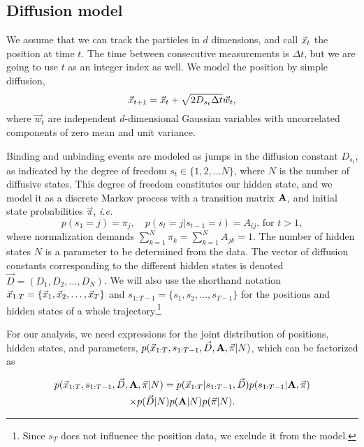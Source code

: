 \subsection{Diffusion model}
\label{Sec:esimodel}
We assume that we can track the particles in $d$ dimensions, and call
$\vec{x}_t$ the position at time $t$.  The time between consecutive
measurements is $\Delta t$, but we are going to use $t$ as an integer
index as well. We model the position by
simple diffusion,
\begin{equation}\label{eq:diff1}
        \vec{x}_{t+1}=\vec{x}_t+\sqrt{2D_{s_t}\Delta t}\vec{w}_t,
\end{equation}
where $\vec{w}_t$ are independent $d$-dimensional Gaussian variables
with uncorrelated components of zero mean and unit variance.

Binding and unbinding events are modeled as jumps in the diffusion
constant $D_{s_t}$, as indicated by the degree of freedom
\mbox{$s_t\in\{1,2,\ldots N\}$}, where $N$ is the number of diffusive 
states. This degree of freedom constitutes our hidden state, and we
model it as a discrete Markov process with a transition matrix
$\mathbf{A}$, and initial state probabilities
$\vec{\pi}$, \textit{i.e.}
\begin{equation}\label{eq:Aij}
p(s_1=j)=\pi_j,\quad 
p(s_t=j|s_{t-1}=i)=A_{ij}\text{, for $t>1$},
\end{equation}
where normalization demands
$\sum_{k=1}^N\pi_k=\sum_{k=1}^NA_{jk}=1$. The number of hidden states
$N$ is a parameter to be determined from the data.  The vector of
diffusion constants corresponding to the different hidden states is
denoted $\vec D=(D_1,D_2,\ldots,D_N)$. We will also use the
shorthand notation $\vec{x}_{1:T}=\{\vec{x}_1,\vec{x}_2,\ldots , \vec{x}_T\}$ and
$s_{1:T-1}=\{s_1,s_2,\ldots,s_{T-1}\}$ for the positions and hidden
states of a whole trajectory.\footnote{Since $s_T$ does not influence
the position data, we exclude it from the model.}

For our analysis, we need expressions for the joint distribution of
positions, hidden states, and parameters,
$p(\vec{x}_{1:T},s_{1:T-1},\vec{D},\mathbf{A},\vec\pi|N)$, which can be
factorized as

\begin{multline}\label{eq:efactor1}
p(\vec{x}_{1:T},s_{1:T-1},\vec{D},\mathbf{A},\vec\pi|N)
=p(\vec{x}_{1:T}|s_{1:T-1},\vec{D})
p(s_{1:T-1}|\mathbf{A},\vec\pi)\\
\times p(\vec{D}|N)
p(\mathbf{A}|N)
p(\vec\pi|N).
\end{multline}

